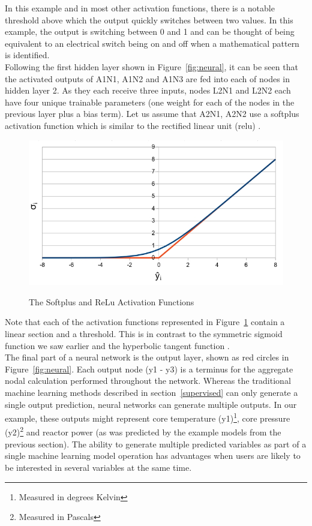 \noindent
In this example and in most other activation functions, there is a notable threshold above which the output quickly switches between two values. In this example, the output is switching between 0 and 1 and can be thought of being equivalent to an electrical switch being on and off when a mathematical pattern is identified. \\


\noindent
Following the first hidden layer shown in Figure~\ref{fig:neural}, it can be seen that the activated outputs of A1N1, A1N2 and A1N3 are fed into each of nodes in hidden layer 2.  As they each receive three inputs, nodes L2N1 and L2N2 each have four unique trainable parameters (one weight for each of the nodes in the previous layer plus a bias term). Let us assume that A2N1, A2N2 use a softplus activation function \cite{zheng2015improving} which is similar to the rectified linear unit (relu) \cite{hara2015analysis}. \\

\begin{figure}[p]
	\centering
	\includegraphics[scale=0.5]{Figures/softplus_relu.jpg}
	\caption{The Softplus and ReLu Activation Functions} { }
	\label{fig:soft_relu}
\end{figure}

\noindent
Note that each of the activation functions represented in Figure~\ref{fig:soft_relu} contain a linear section and a threshold. This is in contrast to the symmetric sigmoid function we saw earlier and the hyperbolic tangent function \cite{anastassiou2011multivariate}. \\

\noindent
The final part of a neural network is the output layer, shown as red circles in Figure~\ref{fig:neural}. Each output node (y1 - y3) is a terminus for the aggregate nodal calculation performed throughout the network. Whereas the traditional machine learning methods described in section~\ref{supervised} can only generate a single output prediction, neural networks can generate multiple outputs.  In our example, these outputs might represent core temperature (y1)\footnote{Measured in degrees Kelvin}, core pressure (y2)\footnote{Measured in Pascals} and reactor power (as was predicted by the example models from the previous section). The ability to generate multiple predicted variables as part of a single machine learning model operation has advantages when users are likely to be interested in several variables at the same time. 
\\

